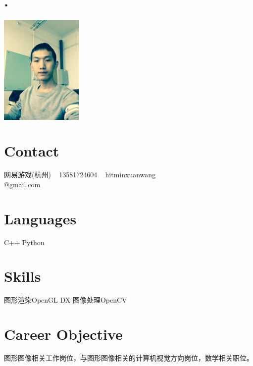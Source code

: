 \documentclass[]{cv-style} %
\begin{document}
\header{ }{  }
\begin{aside}
\section{.}
\includegraphics[width=4cm]{mathen}
\section{Contact}
网易游戏(杭州)
~
13581724604
~
hitminxuanwang\\@gmail.com
\section{Languages}
C++
Python
\section{Skills}
图形渲染OpenGL DX
图像处理OpenCV
\end{aside}
\section{Career Objective}
  \vspace{-0.2cm}
图形图像相关工作岗位，与图形图像相关的计算机视觉方向岗位，数学相关职位。
\end{document}
